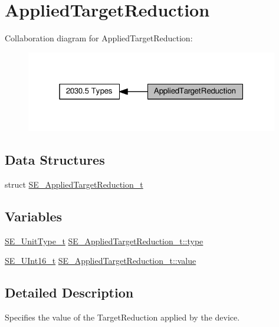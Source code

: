 \hypertarget{group__AppliedTargetReduction}{}\section{Applied\+Target\+Reduction}
\label{group__AppliedTargetReduction}
Collaboration diagram for Applied\+Target\+Reduction\+:\nopagebreak
\begin{figure}[H]
\begin{center}
\leavevmode
\includegraphics[width=313pt]{group__AppliedTargetReduction}
\end{center}
\end{figure}
\subsection*{Data Structures}
\begin{DoxyCompactItemize}
\item 
struct \hyperlink{structSE__AppliedTargetReduction__t}{S\+E\+\_\+\+Applied\+Target\+Reduction\+\_\+t}
\end{DoxyCompactItemize}
\subsection*{Variables}
\begin{DoxyCompactItemize}
\item 
\hyperlink{group__UnitType_ga402dc1288733e4df30c6ae69e947cebe}{S\+E\+\_\+\+Unit\+Type\+\_\+t} \hyperlink{group__AppliedTargetReduction_ga3af211b30214fb46680092fe25e0d7b9}{S\+E\+\_\+\+Applied\+Target\+Reduction\+\_\+t\+::type}
\item 
\hyperlink{group__UInt16_gac68d541f189538bfd30cfaa712d20d29}{S\+E\+\_\+\+U\+Int16\+\_\+t} \hyperlink{group__AppliedTargetReduction_gad13505880133924960036379d13948c9}{S\+E\+\_\+\+Applied\+Target\+Reduction\+\_\+t\+::value}
\end{DoxyCompactItemize}


\subsection{Detailed Description}
Specifies the value of the Target\+Reduction applied by the device. 

